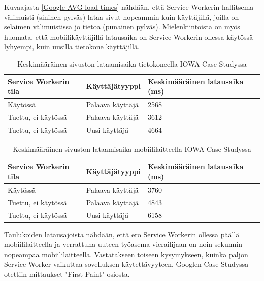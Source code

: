 \documentclass{tktltiki}
\begin{document}
Kuvaajasta \ref{Google AVG load times} nähdään, että Service Workerin hallitsema välimuisti (sininen pylväs) lataa sivut nopeammin kuin käyttäjillä, joilla on selaimen välimuistissa jo tietoa (punainen pylväs). Mielenkiintoista on myös huomata, että mobiilikäyttäjillä latausaika on Service Workerin ollessa käytössä lyhyempi, kuin uusilla tietokone käyttäjillä. 

\begin{table}[h]
\centering
\begin{small}
\caption{Keskimääräinen sivuston lataamisaika tietokoneella IOWA Case Studyssa \cite{Walton} }
\begin{tabular}{|L{5cm}|L{5cm}|L{5cm}|}
\hline
\textbf{Service Workerin tila} & 
\textbf{Käyttäjätyyppi} &
\textbf{Keskimääräinen latausaika (ms)}
\\ \hline
Käytössä & 
Palaava käyttäjä &
2568
\\ \hline
Tuettu, ei käytössä & 
Palaava käyttäjä &
3612
\\ \hline
Tuettu, ei käytössä & 
Uusi käyttäjä &
4664
\\ \hline
\end{tabular}
\label{table:loading time on pc}
\end{small}
\end{table}

\clearpage

\begin{table}[h]
\centering
\begin{small}
\caption{Keskimääräinen sivuston lataamisaika mobiililaitteella IOWA Case Studyssa \cite{Walton} }
\begin{tabular}{|L{5cm}|L{5cm}|L{5cm}|}
\hline
\textbf{Service Workerin tila} & 
\textbf{Käyttäjätyyppi} &
\textbf{Keskimääräinen latausaika (ms)}
\\ \hline
Käytössä & 
Palaava käyttäjä &
3760
\\ \hline
Tuettu, ei käytössä & 
Palaava käyttäjä &
4843
\\ \hline
Tuettu, ei käytössä & 
Uusi käyttäjä &
6158
\\ \hline
\end{tabular}
\label{table:loading time on mobile}
\end{small}
\end{table}


Taulukoiden latausajoista nähdään, että ero Service Workerin ollessa päällä mobiililaitteella ja verrattuna uuteen työasema vierailijaan on noin sekunnin nopeampaa mobiililaitteella. Vastatakseen toiseen kysymykseen, kuinka paljon Service Worker vaikuttaa sovelluksen käytettävyyteen, Googlen Case Studyssa otettiin mittaukset "First Paint" osiosta.
\end{document}
